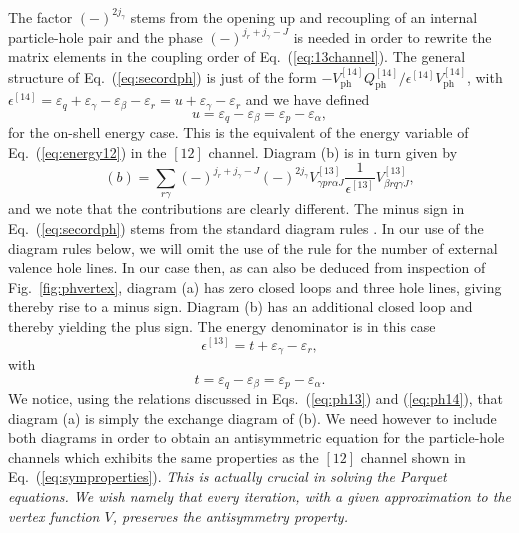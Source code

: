 The factor $(-)^{2j_{\gamma}}$ stems from the opening up
and recoupling of an internal particle-hole pair \cite{kstop81}
and the phase $(-)^{j_r+j_{\gamma}-J}$ is needed in order
to rewrite the matrix elements in the coupling order of
Eq.\ (\ref{eq:13channel}).
The general structure of Eq.\ (\ref{eq:secordph}) is
just of the form $-V_{\mathrm{ph}}^{[14]}Q^{[14]}_{\mathrm{ph}}/\epsilon^{[14]}V_{\mathrm{ph}}^{[14]}$, with
$ \epsilon^{[14]}=\varepsilon_{q}+\varepsilon_{\gamma}-\varepsilon_{\beta}-
                \varepsilon_{r}=u+\varepsilon_{\gamma}-\varepsilon_{r}$
and we have defined
\begin{equation}
  u=\varepsilon_{q}-\varepsilon_{\beta}=\varepsilon_{p}-\varepsilon_{\alpha},
\end{equation}
for the on-shell energy case.
This is the equivalent of the energy variable of Eq.\ (\ref{eq:energy12}) in
the $[12]$ channel.
Diagram (b) is in turn given by
\begin{equation}
      (b)=\sum_{r\gamma}(-)^{j_r+j_{\gamma}-J}(-)^{2j_{\gamma}}
      V^{[13]}_{\gamma pr\alpha J}
      \frac{1}{\epsilon^{[13]}}V^{[13]}_{\beta rq\gamma J} ,
       \label{eq:secordphdirect}
\end{equation}
and we note that the contributions are clearly different.
The minus sign in Eq.\ (\ref{eq:secordph}) stems from the standard
diagram rules \cite{kstop81}. 
In our use of the diagram rules below, we will omit the use
of the rule for the number of external valence hole lines.
In our case then, as can also be deduced from inspection of
Fig.\ \ref{fig:phvertex}, diagram (a) has  zero closed loops and
three hole lines,
giving thereby rise to a minus sign. 
Diagram (b) has an additional closed
loop and thereby yielding the plus sign.
The energy denominator is in this case
\begin{equation} 
      \epsilon^{[13]}=t+\varepsilon_{\gamma}-\varepsilon_{r},
\end{equation}
with 
\begin{equation}
  t=\varepsilon_{q}-\varepsilon_{\beta}=\varepsilon_{p}-\varepsilon_{\alpha}.
\end{equation}
We notice, using the relations discussed
in Eqs.\ (\ref{eq:ph13})
and (\ref{eq:ph14}), that diagram (a) is simply the 
exchange diagram of (b). We need however to include
both diagrams in order to obtain an
antisymmetric equation for the particle-hole channels
which exhibits the same properties as the $[12]$ channel
shown in Eq.\ (\ref{eq:symproperties}). {\em This is actually crucial
in solving the Parquet equations. We wish namely that 
every iteration, with a given approximation to the 
vertex function $V$, preserves the antisymmetry property.}
